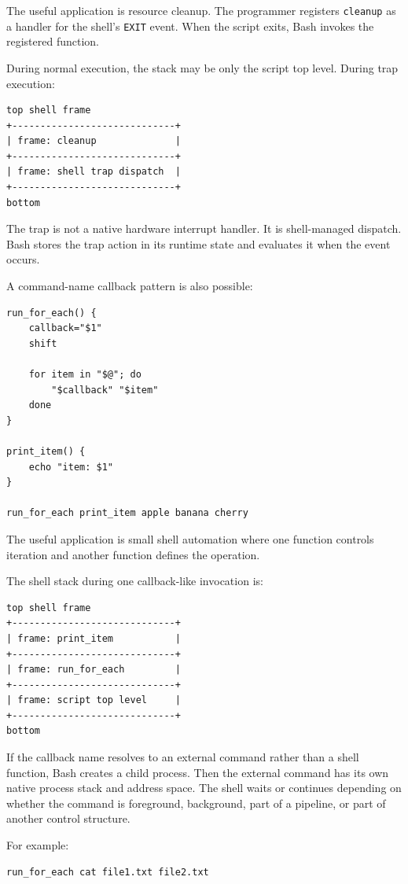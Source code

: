 \documentclass[a4paper,twoside]{report}
\begin{document}
The useful application is resource cleanup. The programmer registers \texttt{cleanup} as a handler for the shell's \texttt{EXIT} event. When the script exits, Bash invokes the registered function.

During normal execution, the stack may be only the script top level. During trap execution:

\begin{verbatim}
top shell frame
+-----------------------------+
| frame: cleanup              |
+-----------------------------+
| frame: shell trap dispatch  |
+-----------------------------+
bottom
\end{verbatim}

The trap is not a native hardware interrupt handler. It is shell-managed dispatch. Bash stores the trap action in its runtime state and evaluates it when the event occurs.

A command-name callback pattern is also possible:

\begin{verbatim}
run_for_each() {
    callback="$1"
    shift

    for item in "$@"; do
        "$callback" "$item"
    done
}

print_item() {
    echo "item: $1"
}

run_for_each print_item apple banana cherry
\end{verbatim}

The useful application is small shell automation where one function controls iteration and another function defines the operation.

The shell stack during one callback-like invocation is:

\begin{verbatim}
top shell frame
+-----------------------------+
| frame: print_item           |
+-----------------------------+
| frame: run_for_each         |
+-----------------------------+
| frame: script top level     |
+-----------------------------+
bottom
\end{verbatim}

If the callback name resolves to an external command rather than a shell function, Bash creates a child process. Then the external command has its own native process stack and address space. The shell waits or continues depending on whether the command is foreground, background, part of a pipeline, or part of another control structure.

For example:

\begin{verbatim}
run_for_each cat file1.txt file2.txt
\end{verbatim}
\end{document}
